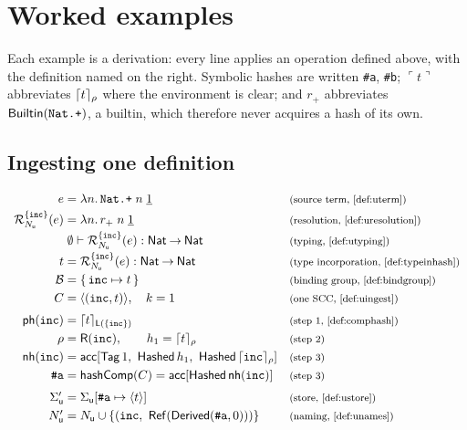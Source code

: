 \documentclass[11pt]{article}
\theoremstyle{definition}
\theoremstyle{plain}
\theoremstyle{remark}
\begin{document}
\section{Worked examples}\label{sec:examples}

Each example is a derivation: every line applies an operation defined above, with the definition
named on the right. Symbolic hashes are written \texttt{\#a}, \texttt{\#b}; $\ulcorner t \urcorner$
abbreviates $\lceil t \rceil_{\rho}$ where the environment is clear; and $r_{+}$ abbreviates
$\mathsf{Builtin}(\texttt{Nat.+})$, a builtin, which therefore never acquires a hash of its own.

\subsection{Ingesting one definition}\label{ex:ingest}

\[
\begin{array}{r@{\;}l@{\quad}l}
  e &= \ulam{n}{\uapp{\uapp{\uvar{\texttt{Nat.+}}}{\uvar{n}}}{\unat{1}}}
    & \just{source term, \cref{def:uterm}} \\[3pt]
  \Res{\{\texttt{inc}\}}{\UNames}(e)
    &= \ulam{n}{\uapp{\uapp{\uref{r_{+}}}{\uvar{n}}}{\unat{1}}}
    & \just{resolution, \cref{def:uresolution}} \\[3pt]
  {} &\utypes{\emptyset}{\Res{\{\texttt{inc}\}}{\UNames}(e)}{\uarr{\TNat}{\TNat}}
    & \just{typing, \cref{def:utyping}} \\[3pt]
  t &= \uann{\Res{\{\texttt{inc}\}}{\UNames}(e)}{\uarr{\TNat}{\TNat}}
    & \just{type incorporation, \cref{def:typeinhash}} \\[3pt]
  \bg &= \{\,\texttt{inc} \mapsto t\,\}
    & \just{binding group, \cref{def:bindgroup}} \\[3pt]
  C &= \langle(\texttt{inc}, t)\rangle,\quad k = 1
    & \just{one SCC, \cref{def:uingest}} \\[6pt]
  \phash{\texttt{inc}} &= \uhash{\mathsf{L}(\{\texttt{inc}\})}{t}
    & \just{step 1, \cref{def:comphash}} \\[3pt]
  \HEnv &= \mathsf{R}(\texttt{inc}),\qquad h_1 = \uhash{\HEnv}{t}
    & \just{step 2} \\[3pt]
  \nhash{\texttt{inc}} &= \mathsf{acc}[\mathsf{Tag}\,1,\ \mathsf{Hashed}\,h_1,\
                          \mathsf{Hashed}\,\uhash{\HEnv}{\uvar{\texttt{inc}}}]
    & \just{step 3} \\[3pt]
  \texttt{\#a} &= \comphash(C) = \mathsf{acc}[\mathsf{Hashed}\,\nhash{\texttt{inc}}]
    & \just{step 3} \\[6pt]
  \UStore' &= \upd{\UStore}{\texttt{\#a}}{\langle t \rangle}
    & \just{store, \cref{def:ustore}} \\[3pt]
  \UNames' &= \UNames \cup \{(\texttt{inc},\ \URefT{\UDer{\texttt{\#a}}{0}})\}
    & \just{naming, \cref{def:unames}}
\end{array}
\]
\end{document}
